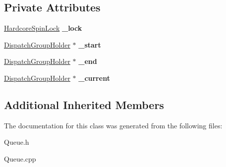 \subsection*{Private Attributes}
\begin{DoxyCompactItemize}
\item 
\mbox{\label{class_dispatch_group_addee2d352ae490c730edd60a1b9a1f44}} 
\hyperlink{class_hardcore_spin_lock}{Hardcore\+Spin\+Lock} {\bfseries \+\_\+lock}
\item 
\mbox{\label{class_dispatch_group_aad762a4511216a55c195c9df783fce67}} 
\hyperlink{class_dispatch_group_holder}{Dispatch\+Group\+Holder} $\ast$ {\bfseries \+\_\+start}
\item 
\mbox{\label{class_dispatch_group_a6d71594707c8ea942534e1a985914b21}} 
\hyperlink{class_dispatch_group_holder}{Dispatch\+Group\+Holder} $\ast$ {\bfseries \+\_\+end}
\item 
\mbox{\label{class_dispatch_group_a10f894ac59e3e32aa51ad8548b1f1e0f}} 
\hyperlink{class_dispatch_group_holder}{Dispatch\+Group\+Holder} $\ast$ {\bfseries \+\_\+current}
\end{DoxyCompactItemize}
\subsection*{Additional Inherited Members}


The documentation for this class was generated from the following files\+:\begin{DoxyCompactItemize}
\item 
Queue.\+h\item 
Queue.\+cpp\end{DoxyCompactItemize}
